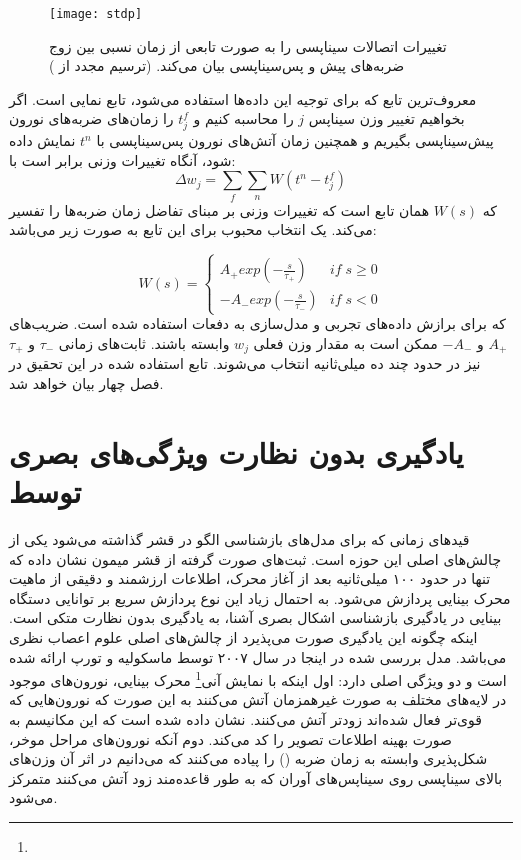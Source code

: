 \begin{figure}
\centering
{\footnotesize
\texttt{[image: stdp]}
\caption[یادگیری وابسته به زمان ضربه]{ تغییرات اتصالات سیناپسی را به صورت تابعی از زمان نسبی بین زوج ضربه‌های پیش و پس‌سیناپسی بیان می‌کند. (ترسیم مجدد از \cite{bi1998synaptic})}
\label{fig:stdp}
}
\end{figure}
معروف‌ترین تابع که برای توجیه این داده‌ها استفاده می‌شود، تابع نمایی است. اگر بخواهیم تغییر وزن سیناپس $j$ را محاسبه کنیم و $t_j^f$ را زمان‌های ضربه‌های نورون پیش‌سیناپسی بگیریم و همچنین زمان آتش‌های نورون پس‌سیناپسی با $t^n$ نمایش داده شود، آنگاه تغییرات وزنی برابر است با:
\begin{equation} \label{eq:stdp1}
\Delta w_j = \sum_f\sum_nW(t^n-t^f_j)
\end{equation}
که $W(s)$ همان تابع  است که تغییرات وزنی بر مبنای تفاضل زمان ضربه‌ها را تفسیر می‌کند. یک انتخاب محبوب برای این تابع به صورت زیر می‌باشد:

\begin{equation} \label{eq:stdp2}
W(s) =  \left\{\begin{matrix}
A_+exp(-\frac{s}{\tau_+}) & if \;s\geqslant 0\\ 
-A_-exp(-\frac{s}{\tau_-}) & if \; s<0
\end{matrix}\right.
\end{equation}
که برای برازش داده‌های تجربی \cite{zhang1998critical} و مدل‌سازی \cite{song2000competitive} به دفعات استفاده شده است. 
ضریب‌های $A_+$ و $-A_-$ ممکن است به مقدار وزن فعلی $w_j$ وابسته باشند. ثابت‌های زمانی $\tau_-$ و $\tau _+$ نیز در حدود چند ده میلی‌ثانیه انتخاب می‌شوند. تابع  استفاده شده در این تحقیق در فصل چهار بیان خواهد شد.


\section{یادگیری بدون نظارت ویژگی‌های بصری توسط }
قیدهای زمانی که برای مدل‌های بازشناسی الگو در قشر گذاشته می‌شود یکی از چالش‌های اصلی این حوزه است. ثبت‌های صورت گرفته از قشر  میمون نشان داده که تنها در حدود ۱۰۰ میلی‌ثانیه بعد از آغاز محرک، اطلاعات ارزشمند و دقیقی از ماهیت محرک بینایی پردازش می‌شود\cite{hung2005fast}. به احتمال زیاد این نوع پردازش سریع بر توانایی دستگاه بینایی در یادگیری بازشناسی اشکال بصری آشنا، به یادگیری بدون نظارت متکی است. اینکه چگونه این یادگیری صورت می‌پذیرد از چالش‌های اصلی علوم اعصاب نظری می‌باشد. 
مدل بررسی شده در اینجا در سال ۲۰۰۷ توسط ماسکولیه و تورپ\cite{masquelier2007unsupervised} ارائه شده است و دو ویژگی اصلی دارد: اول اینکه با نمایش آنی\footnote{} محرک بینایی، نورون‌های موجود  در لایه‌های مختلف به صورت غیرهمزمان آتش می‌کنند به این صورت که نورون‌هایی که قوی‌تر فعال شده‌اند زودتر آتش می‌کنند. نشان داده شده است که این مکانیسم به صورت بهینه اطلاعات تصویر را کد می‌کند\cite{Rullen_2001}.  دوم آنکه نورون‌های مراحل موخر، شکل‌پذیری وابسته به زمان ضربه () را پیاده می‌کنند که می‌دانیم در اثر آن وزن‌های بالای سیناپسی روی سیناپس‌های آوران که به طور قاعده‌مند زود آتش می‌کنند متمرکز می‌شود\cite{guyonneau2005neurons,song2000competitive}. 

